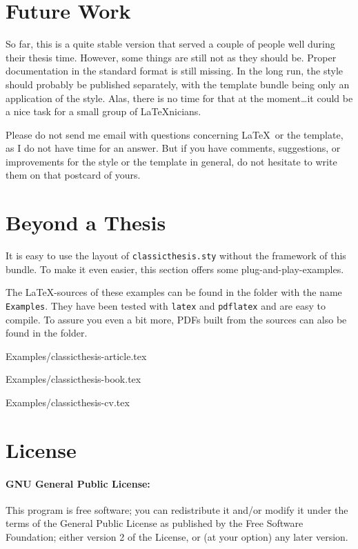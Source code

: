 \section{Future Work}
So far, this is a quite stable version that served a couple of people
well during their thesis time. However, some things are still not as
they should be. Proper documentation in the standard format is still
missing. In the long run, the style should probably be published
separately, with the template bundle being only an application of the
style. Alas, there is no time for that at the moment\dots it could be
a nice task for a small group of \LaTeX nicians.

Please do not send me email with questions concerning \LaTeX\ or the
template, as I do not have time for an answer. But if you have
comments, suggestions, or improvements for the style or the template
in general, do not hesitate to write them on that postcard of yours.


\section{Beyond a Thesis}
It is easy to use the layout of \texttt{classicthesis.sty} without the
framework of this bundle. To make it even easier, this section offers 
some plug-and-play-examples.

The \LaTeX -sources of these examples can be found in the folder 
with the name \texttt{Examples}. They have been tested with  
\texttt{latex} and \texttt{pdflatex} and are easy to compile. To 
assure you even a bit more, PDFs built from the sources can also 
be found in the folder. 

%
    {Examples/classicthesis-article.tex}
    
%
    {Examples/classicthesis-book.tex}

%
    {Examples/classicthesis-cv.tex}


\section{License}
\paragraph{GNU General Public License:} This program is free software;
you can redistribute it and/or modify
 it under the terms of the  General Public License as
 published by
 the Free Software Foundation; either version 2 of the License, or
 (at your option) any later version.

